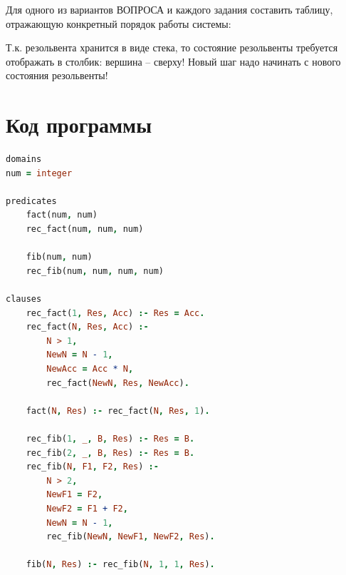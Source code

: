 \documentclass[14pt]{report}
\begin{document}
Для одного из вариантов ВОПРОСА и каждого задания составить таблицу,
отражающую конкретный порядок работы системы:

Т.к. резольвента хранится в виде стека, то состояние резольвенты требуется отображать
в столбик: вершина – сверху! Новый шаг надо начинать с нового состояния резольвенты!

\section*{Код программы}

\vspace{\baselineskip}

\begin{lstlisting}[language=Prolog]
domains
num = integer

predicates
	fact(num, num)
	rec_fact(num, num, num)

	fib(num, num)
	rec_fib(num, num, num, num)

clauses
	rec_fact(1, Res, Acc) :- Res = Acc.
	rec_fact(N, Res, Acc) :- 
		N > 1, 
		NewN = N - 1, 
		NewAcc = Acc * N, 
		rec_fact(NewN, Res, NewAcc).

	fact(N, Res) :- rec_fact(N, Res, 1).

	rec_fib(1, _, B, Res) :- Res = B.
	rec_fib(2, _, B, Res) :- Res = B.
	rec_fib(N, F1, F2, Res) :- 
		N > 2, 
		NewF1 = F2, 
		NewF2 = F1 + F2, 
		NewN = N - 1, 
		rec_fib(NewN, NewF1, NewF2, Res).

	fib(N, Res) :- rec_fib(N, 1, 1, Res).

\end{lstlisting}
\end{document}
